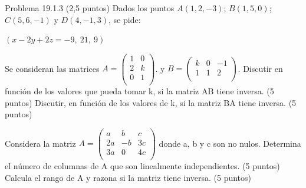 \documentclass[addpoints,spanish, 12pt,a4paper]{exam}
\begin{document}
\begin{questions}


\question Problema 19.1.3 (2,5 puntos) Dados los puntos $A(1, 2, -3)$; $B(1, 5, 0)$; $C(5, 6, -1)$ y $D(4, -1, 3)$,
se pide:
\begin{solution}
    $\left( x - 2 y + 2 z = -9, \  21, \  9\right)$
\end{solution}

\question Se consideran las matrices $A=\left( \begin{matrix}
   1 & 0  \\
   2 & k  \\
   0 & 1  \\
\end{matrix} \right)$. y $B=\left( \begin{matrix}
   k & 0 & -1  \\
   1 & 1 & 2  \\
\end{matrix} \right)$.
Discutir en función de los valores que pueda tomar k, si la matriz AB tiene inversa.	(5 puntos)
Discutir, en función de los valores de k, si la matriz BA tiene inversa.	(5 puntos)

\question Considera la matriz $A=\left( \begin{matrix}
   a & b & c  \\
   2a & -b & 3c  \\
   3a & 0 & 4c  \\
\end{matrix} \right)$ donde a, b y c son no nulos.
Determina el número de columnas de A que son linealmente independientes.	(5 puntos)
	Calcula el rango de A y razona si la matriz tiene inversa.	(5 puntos)



\end{questions}
\end{document}
